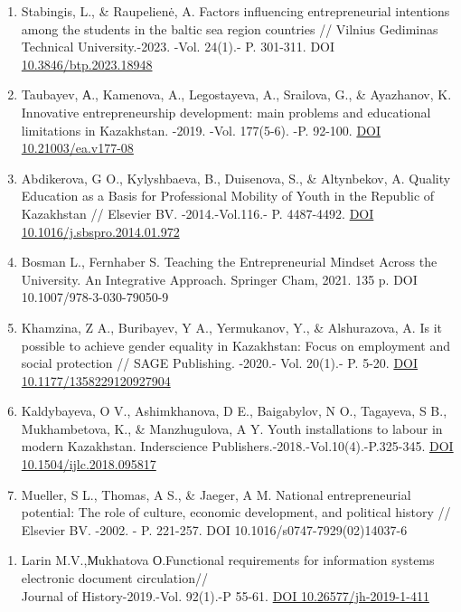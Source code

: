\begin{references}
\begin{enumerate}
\def\labelenumi{\arabic{enumi}.}
\setcounter{enumi}{3}
\item
  Stabingis, L., \& Raupelienė, A. Factors influencing entrepreneurial
  intentions among the students in the baltic sea region countries //
  Vilnius Gediminas Technical University.-2023. -Vol. 24(1).- P.
  301-311. DOI
  \href{https://doi.org/10.3846/btp.2023.18948}{10.3846/btp.2023.18948}
\item
  Taubayev, А., Kamenova, A., Legostayeva, A., Srailova, G., \&
  Ayazhanov, K. Innovative entrepreneurship development: main problems
  and educational limitations in Kazakhstan. -2019. -Vol. 177(5-6). -P.
  92-100. \href{https://doi.org/10.21003/ea.v177-08}{DOI
  10.21003/ea.v177-08}
\item
  Abdikerova, G O., Kylyshbaeva, B., Duisenova, S., \& Altynbekov, A.
  Quality Education as a Basis for Professional Mobility of Youth in the
  Republic of Kazakhstan // Elsevier BV. -2014.-Vol.116.- P. 4487-4492.
  \href{https://doi.org/10.1016/j.sbspro.2014.01.972}{DOI
  10.1016/j.sbspro.2014.01.972}
\item
  Bosman L., Fernhaber S. Teaching the Entrepreneurial Mindset Across
  the University. An Integrative Approach. Springer Cham, 2021. 135 p.
  DOI 10.1007/978-3-030-79050-9
\item
  Khamzina, Z A., Buribayev, Y A., Yermukanov, Y., \& Alshurazova, A. Is
  it possible to achieve gender equality in Kazakhstan: Focus on
  employment and social protection // SAGE Publishing. -2020.- Vol.
  20(1).- P. 5-20. \href{https://doi.org/10.1177/1358229120927904}{DOI
  10.1177/1358229120927904}
\item
  Kaldybayeva, O V., Ashimkhanova, D E., Baigabylov, N O., Tagayeva, S
  B., Mukhambetova, K., \& Manzhugulova, A Y. Youth installations to
  labour in modern Kazakhstan. Inderscience
  Publishers.-2018.-Vol.10(4).-P.325-345.
  \href{https://doi.org/10.1504/ijlc.2018.095817}{DOI
  10.1504/ijlc.2018.095817}
\item
  Mueller, S L., Thomas, A S., \& Jaeger, A M. National entrepreneurial
  potential: The role of culture, economic development, and political
  history // Elsevier BV. -2002. - P. 221-257.
  DOI 10.1016/s0747-7929(02)14037-6
\end{enumerate}

\begin{enumerate}
\def\labelenumi{\arabic{enumi}.}
\setcounter{enumi}{10}
\item
  Larin M.V.,Мukhatova О.Functional requirements for information systems
  electronic document circulation//\\Journal of History-2019.-Vol.
  92(1).-P 55-61. \href{https://doi.org/10.26577/jh-2019-1-411}{DOI
  10.26577/jh-2019-1-411}
\end{enumerate}
\end{references}

